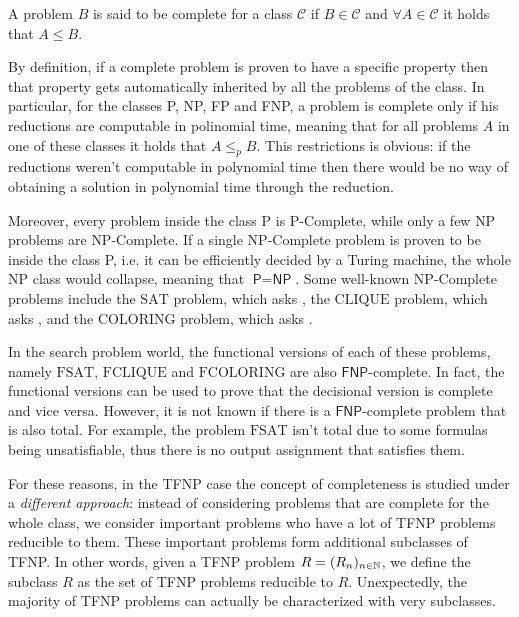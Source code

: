 \begin{definition}
    A problem $B$ is said to be complete for a class $\mathcal{C}$ if $B \in \mathcal{C}$ and $\forall A \in \mathcal{C}$ it holds that $A \leq B$.
\end{definition}

By definition, if a complete problem is proven to have a specific property then that property gets automatically inherited by all the problems of the class. In particular, for the classes \textsf{P}, \textsf{NP}, \textsf{FP} and \textsf{FNP}, a problem is complete only if his reductions are computable in polinomial time, meaning that for all problems $A$ in one of these classes it holds that $A \leq_p B$. This restrictions is obvious: if the reductions weren't computable in polynomial time then there would be no way of obtaining a solution in polynomial time through the reduction.

Moreover, every problem inside the class \textsf{P} is \textsf{P}-Complete, while only a few \textsf{NP} problems are \textsf{NP}-Complete. If a single \textsf{NP}-Complete problem is proven to be inside the class \textsf{P}, i.e. it can be efficiently decided by a Turing machine, the whole \textsf{NP} class would collapse, meaning that $\textsf{P} = \textsf{NP}$. Some well-known \textsf{NP}-Complete problems include the $\mathrm{SAT}$ problem, which asks , the $\mathrm{CLIQUE}$ problem, which asks , and the $\mathrm{COLORING}$ problem, which asks .

In the search problem world, the functional versions of each of these problems, namely $\mathrm{FSAT}$, $\mathrm{FCLIQUE}$ and $\mathrm{FCOLORING}$ are also $\textsf{FNP}$-complete. In fact, the functional versions can be used to prove that the decisional version is complete and vice versa. However, it is not known if there is a $\textsf{FNP}$-complete problem that is also total. For example, the problem $\mathrm{FSAT}$ isn't total due to some formulas being unsatisfiable, thus there is no output assignment that satisfies them.

For these reasons, in the \textsf{TFNP} case the concept of completeness is studied under a \textit{different approach}: instead of considering problems that are complete for the whole class, we consider important problems who have a lot of \textsf{TFNP} problems reducible to them. These important problems form additional subclasses of \textsf{TFNP}. In other words, given a \textsf{TFNP} problem $R = (R_n)_{n \in \mathbb{N}}$, we define the subclass $R$ as the set of \textsf{TFNP} problems reducible to $R$. Unexpectedly, the majority of \textsf{TFNP} problems can actually be characterized with very subclasses.

